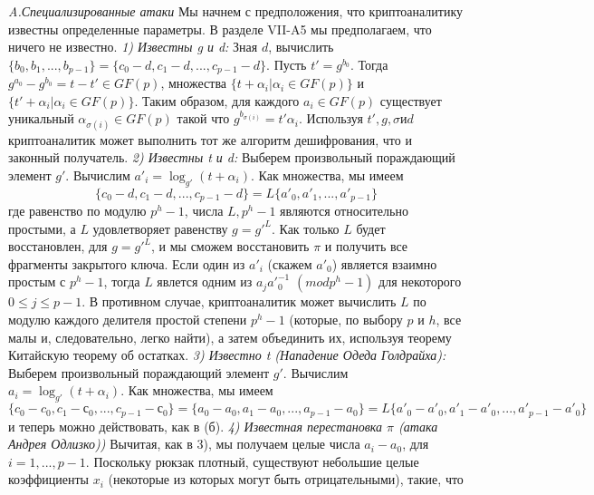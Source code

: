 \documentclass[a4paper,12pt]{article}
\begin{document}
\textsl{A.Специализированные атаки} \newline
Мы начнем с предположения, что криптоаналитику известны определенные параметры. В разделе VII-A5 мы предполагаем, что ничего не известно. \newline
\indent \textsl{1) Известны g и d:} \newline
Зная $d$, вычислить $\{b_0, b_1, ..., b_{p-1} \} = \{c_0 -d, c_1 - d, ..., c_{p-1} -d \}$. Пусть $t'= g^{b_0}$. Тогда $g^{a_0} - g^{b_0} = t - t' \in GF(p)$, множества $\{t + \alpha_i|\alpha_i \in GF(p) \}$ и $\{t' + \alpha_i|\alpha_i \in GF(p) \}$. Таким образом, для каждого $a_i \in GF(p)$ существует уникальный $\alpha_{\sigma(i)} \in GF(p)$ такой что $g^{b_{\sigma(i)}} = t' \alpha_i$. Используя $t', g, \sigma и d$ криптоаналитик может выполнить тот же алгоритм дешифрования, что и законный получатель. \newline
\indent \textsl{2) Известны t и d:} \newline
Выберем произвольный пораждающий элемент $g'$. Вычислим $a'_i = \log_{g'}(t + \alpha_i)$. Как множества, мы имеем $$ \{c_0 -d, c_1 - d, ..., c_{p-1} -d \} = L\{a'_0, a'_1, ..., a'_{p-1} \}$$
где равенство по модулю $p^h - 1$, числа $L, p^h - 1$ являются относительно простыми, а $L$ удовлетворяет равенству $g = g'^L$. Как только $L$ будет восстановлен, для $g = g'^L$, и мы сможем восстановить $\pi$ и получить все фрагменты закрытого ключа. \newline
\indent Если один из $a'_i$ (скажем $a'_0$) является взаимно простым с $p^h - 1$, тогда $L$ явлется одним из $a_j a'_0^{-1}$ $(mod p^h -1)$ для некоторого $ 0 \leq j \leq p-1$. В противном случае, криптоаналитик может вычислить $L$ по модулю каждого делителя простой степени $p^h-1$ (которые, по выбору $p$ и $h$, все малы и, следовательно, легко найти), а затем объединить их, используя теорему Китайскую теорему об остатках. \newline
\indent \textsl{3) Известно t (Нападение Одеда Голдрайха):} \newline
Выберем произвольный пораждающий элемент $g'$. Вычислим $a_i = \log_{g'}(t + \alpha_i)$. Как множества, мы имеем $$ \{c_0 -c_0, c_1 - с_0, ..., c_{p-1} -с_0 \} = \{a_0 -a_0, a_1 - a_0, ..., a_{p-1} -a_0 \} = L\{a'_0 -a'_0 , a'_1 - a'_0, ..., a'_{p-1} - a'_0 \}$$
и теперь можно действовать, как в (б). \newline
\indent \textsl{ 4) Известная перестановка $\pi$ (атака Андрея Одлизко)) } \newline
Вычитая, как в 3), мы получаем целые числа $a_i - a_0$, для $i = 1, ..., p - 1$. Поскольку рюкзак плотный, существуют небольшие целые коэффициенты $x_i$ (некоторые из которых могут быть отрицательными), такие, что
\end{document}
